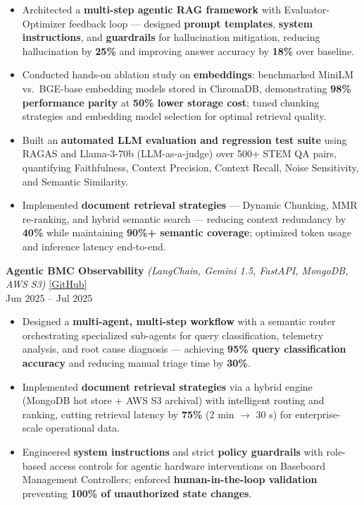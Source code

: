 \documentclass[letterpaper,10.5pt]{extarticle}
\begin{document}
\begin{itemize}[leftmargin=12pt, topsep=1pt, itemsep=0pt, parsep=0pt]
    \item Architected a \textbf{multi-step agentic RAG framework} with Evaluator-Optimizer feedback loop — designed \textbf{prompt templates}, \textbf{system instructions}, and \textbf{guardrails} for hallucination mitigation, reducing hallucination by \textbf{25\%} and improving answer accuracy by \textbf{18\%} over baseline.
    \item Conducted hands-on ablation study on \textbf{embeddings}: benchmarked MiniLM vs.\ BGE-base embedding models stored in ChromaDB, demonstrating \textbf{98\% performance parity} at \textbf{50\% lower storage cost}; tuned chunking strategies and embedding model selection for optimal retrieval quality.
    \item Built an \textbf{automated LLM evaluation and regression test suite} using RAGAS and Llama-3-70b (LLM-as-a-judge) over 500+ STEM QA pairs, quantifying Faithfulness, Context Precision, Context Recall, Noise Sensitivity, and Semantic Similarity.
    \item Implemented \textbf{document retrieval strategies} — Dynamic Chunking, MMR re-ranking, and hybrid semantic search — reducing context redundancy by \textbf{40\%} while maintaining \textbf{90\%+ semantic coverage}; optimized token usage and inference latency end-to-end.
\end{itemize}

\vspace{4pt}

\noindent\textbf{Agentic BMC Observability} \textit{(LangChain, Gemini 1.5, FastAPI, MongoDB, AWS S3)} \hfill \href{https://github.com/slowloris-98/Agentic-Oberservability-BMC}{[GitHub]}\\
Jun 2025 -- Jul 2025

\begin{itemize}[leftmargin=12pt, topsep=1pt, itemsep=0pt, parsep=0pt]
    \item Designed a \textbf{multi-agent, multi-step workflow} with a semantic router orchestrating specialized sub-agents for query classification, telemetry analysis, and root cause diagnosis — achieving \textbf{95\% query classification accuracy} and reducing manual triage time by \textbf{30\%}.
    \item Implemented \textbf{document retrieval strategies} via a hybrid engine (MongoDB hot store + AWS S3 archival) with intelligent routing and ranking, cutting retrieval latency by \textbf{75\%} (2 min $\rightarrow$ 30 s) for enterprise-scale operational data.
    \item Engineered \textbf{system instructions} and strict \textbf{policy guardrails} with role-based access controls for agentic hardware interventions on Baseboard Management Controllers; enforced \textbf{human-in-the-loop validation} preventing \textbf{100\% of unauthorized state changes}.
\end{itemize}
\end{document}
